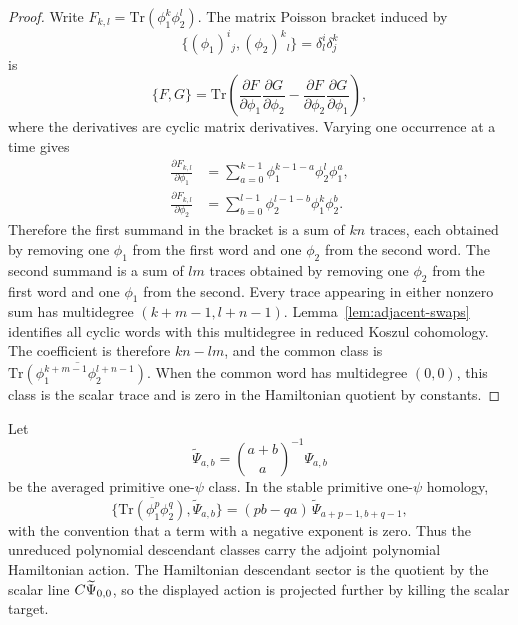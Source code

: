 \documentclass[11pt]{memoir}
\begin{document}
\begin{proof}
  Write $F_{k,l}=\mathrm{Tr}(\phi_1^k\phi_2^l)$. The matrix Poisson bracket
  induced by
  $$\{(\phi_1)^i{}_j,(\phi_2)^k{}_l\}=\delta^i_l\delta^k_j$$
  is
  $$\{F,G\}=\mathrm{Tr}\left(
      \frac{\partial F}{\partial\phi_1}\frac{\partial G}{\partial\phi_2}
      -\frac{\partial F}{\partial\phi_2}\frac{\partial G}{\partial\phi_1}
    \right),$$
  where the derivatives are cyclic matrix derivatives. Varying one occurrence
  at a time gives
  \begin{align*}
  \frac{\partial F_{k,l}}{\partial\phi_1}
    &=\sum_{a=0}^{k-1}\phi_1^{k-1-a}\phi_2^l\phi_1^a,\\
  \frac{\partial F_{k,l}}{\partial\phi_2}
    &=\sum_{b=0}^{l-1}\phi_2^{l-1-b}\phi_1^k\phi_2^b.
  \end{align*}
  Therefore the first summand in the bracket is a sum of $kn$ traces, each
  obtained by removing one $\phi_1$ from the first word and one $\phi_2$ from
  the second word. The second summand is a sum of $lm$ traces obtained by
  removing one $\phi_2$ from the first word and one $\phi_1$ from the second.
  Every trace appearing in either nonzero sum has multidegree
  $(k+m-1,l+n-1)$. Lemma~\ref{lem:adjacent-swaps} identifies all cyclic words
  with this multidegree in reduced Koszul cohomology. The coefficient is
  therefore $kn-lm$, and the common class is
  $\overline{\mathrm{Tr}(\phi_1^{k+m-1}\phi_2^{l+n-1})}$. When the common word
  has multidegree $(0,0)$, this class is the scalar trace and is zero in the
  Hamiltonian quotient by constants.
\end{proof}

\begin{prop}\label{prop:open-descendant-action}
  Let
  $$\widetilde\Psi_{a,b}
    =\binom{a+b}{a}^{-1}\Psi_{a,b}$$
  be the averaged primitive one-$\psi$ class. In the stable primitive one-$\psi$
  homology,
  $$\{\overline{\mathrm{Tr}(\phi_1^p\phi_2^q)},\widetilde\Psi_{a,b}\}
    =(pb-qa)\,\widetilde\Psi_{a+p-1,b+q-1},$$
  with the convention that a term with a negative exponent is zero. Thus the
  unreduced polynomial descendant classes carry the adjoint polynomial
  Hamiltonian action. The Hamiltonian descendant sector is the quotient by the
  scalar line $C\widetilde\Psi_{0,0}$, so the displayed action is projected
  further by killing the scalar target.
\end{prop}
\end{document}
